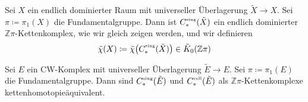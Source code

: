 \begin{definition}
	Sei $X$ ein endlich dominierter Raum mit universeller Überlagerung $\tilde{X}\to X$.
	Sei $\pi \coloneqq \pi_1(X)$ die Fundamentalgruppe.
	Dann ist $C_*^\sing(\tilde{X})$ ein endlich dominierter $\mathbb{Z}\pi$-Kettenkomplex, wie wir gleich zeigen werden, und wir definieren
	\[
		\tilde{\chi}(X) \coloneqq \tilde{\chi} \enbrace*{C^\sing_*(\tilde{X})} \in \tilde{K}_0(\mathbb{Z}\pi)
	\]
\end{definition}
\begin{lemma}
	Sei $E$ ein CW-Komplex mit universeller Überlagerung $\tilde{E} \to E$.
	Sei $\pi \coloneqq \pi_1(E)$ die Fundamentalgruppe.
	Dann sind $C_*^\sing(\tilde{E})$ und $C_*^{\cell}(\tilde{E})$ als $\mathbb{Z}\pi$-Kettenkomplexe kettenhomotopieäquivalent.
\end{lemma}
